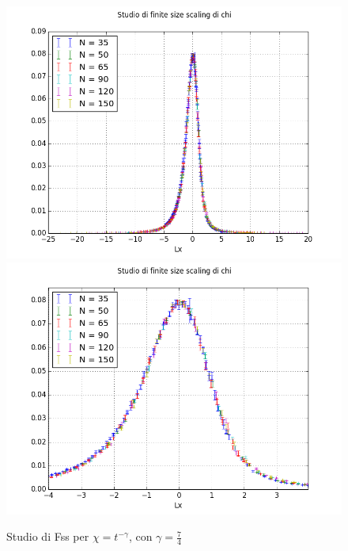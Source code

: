\begin{figure}[h]
		\centering
		\includegraphics[scale=0.6]{sw/fsschi.png}
		\includegraphics[scale=0.6]{sw/fsschizoom.png}
		\caption{Studio di Fss per $\chi = t^{-\gamma}$, con $\gamma = \frac{7}{4}$}
\end{figure}

